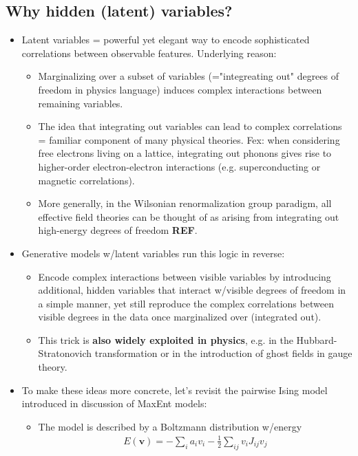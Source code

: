 \documentclass[norsk,a4paper,11pt]{article}
\begin{document}
\subsection{Why hidden (latent) variables?}
\begin{itemize}
	\item Latent variables = powerful yet elegant way to encode sophisticated correlations between observable features. Underlying reason: 
	\begin{itemize}
		\item Marginalizing over a subset of variables (="integreating out" degrees of freedom in physics language) induces complex interactions between remaining variables.
		\item The idea that integrating out variables can lead to complex correlations = familiar component of many physical theories. Fex: when considering free electrons living on a lattice, integrating out phonons gives rise to higher-order electron-electron interactions (e.g. superconducting or magnetic correlations).
		\item More generally, in the Wilsonian renormalization group paradigm, all effective field theories can be thought of as arising from integrating out high-energy degrees of freedom \textbf{REF}.
	\end{itemize}
	\item Generative models w/latent variables run this logic in reverse: 
	\begin{itemize}
		\item Encode complex interactions between visible variables by introducing additional, hidden variables that interact w/visible degrees of freedom in a simple manner, yet still reproduce the complex correlations between visible degrees in the data once marginalized over (integrated out).
		\item This trick is \textbf{also widely exploited in physics}, e.g. in the Hubbard-Stratonovich transformation or in the introduction of ghost fields in gauge theory.
	\end{itemize}
	\item To make these ideas more concrete, let's revisit the pairwise Ising model introduced in discussion of MaxEnt models:
	\begin{itemize}
		\item The model is described by a Boltzmann distribution w/energy
		\begin{align}
			E(\bm{v}) = - \sum_i a_i v_i - \frac{1}{2} \sum_{ij} v_i J_{ij} v_j
		\end{align}

\end{itemize}
\end{itemize}
\end{document}
